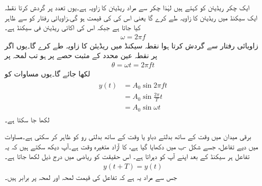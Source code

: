 ایک چکر  ریڈیئن کو کہتے ہیں لہٰذا  چکر سے مراد  ریڈیئن کا زاویہ ہے۔یوں  تعدد پر گردش کرتا نقطہ ایک سیکنڈ میں  ریڈیئن کا زاویہ طے کرے گا یعنی اس کی  کی قیمت  ہو گی۔زاویائی رفتار کو  سے ظاہر کیا جاتا ہے جبکہ اس کی اکائی ریڈیئن فی سیکنڈ  ہے۔
\begin{align}
\omega=2\pi f
\end{align}
زاویائی رفتار  سے گردش کرتا ہوا نقطہ  سیکنڈ میں  ریڈیئن کا زاویہ طے کرے گا۔یوں اگر  پر نقطہ عین  محدد کے مثبت حصے پر ہو تب لمحہ  پر
\begin{align}
\theta=\omega t=2\pi f t
\end{align}
لکھا جائے گا۔یوں مساوات   کو
\begin{gather}
\begin{aligned}\label{مساوات_بدلتا_سائن_نما_تفاعل_ب}
y(t)&=A_0 \sin 2\pi f t\\
&=A_0\sin \frac{2\pi}{T}t\\
&=A_0 \sin \omega t
\end{aligned}
\end{gather}
لکھا جا سکتا ہے۔

برقی میدان میں  وقت کے ساتھ بدلتے دباو یا وقت کے ساتھ بدلتی رو کو ظاہر کر سکتی ہے۔مساوات  میں دیے تفاعل، جسے شکل -ب میں دکھایا گیا ہے،  کا آزاد متغیرہ وقت  ہے۔آپ دیکھ سکتے ہیں کہ یہ تفاعل ہر  سیکنڈ کے بعد اپنے آپ کو دہراتا ہے۔ اس حقیقت کو ریاضی میں درج ذیل لکھا جاتا ہے۔
\begin{align}
y(t+T)=y( t)
\end{align}
جس سے مراد یہ ہے کہ تفاعل کی قیمت لمحہ  اور لمحہ  پر برابر ہیں۔

